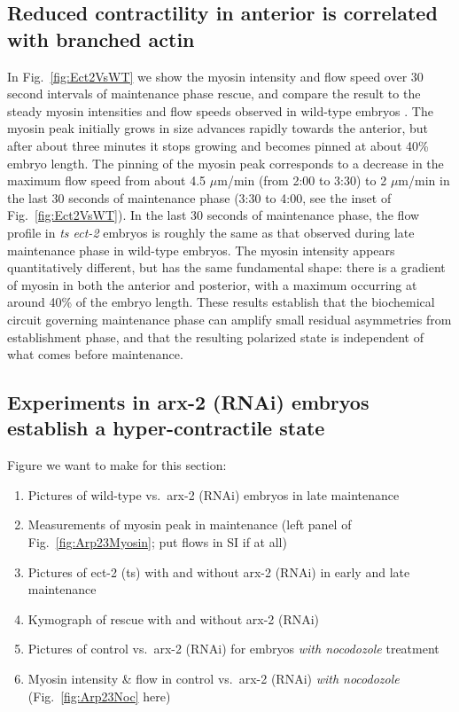 \documentclass[11pt]{article}
\newcommand{\red}[1]{\color{red}#1\normalcolor}
\newcommand{\6}[1]{#1_{\text{6}}}
\newcommand{\3}[1]{#1_{\text{3}}}
\begin{document}
\subsection{Reduced contractility in anterior is correlated with branched actin}
In Fig.\ \ref{fig:Ect2VsWT} we show the myosin intensity and flow speed over 30 second intervals of maintenance phase rescue, and compare the result to the steady myosin intensities and flow speeds observed in wild-type embryos \citep{sailer2015dynamic}. The myosin peak initially grows in size advances rapidly towards the anterior, but after about three minutes it stops growing and becomes pinned at about 40\% embryo length. The pinning of the myosin peak corresponds to a decrease in the maximum flow speed from about 4.5 $\mu$m/min (from 2:00 to 3:30) to 2 $\mu$m/min in the last 30 seconds of maintenance phase (3:30 to 4:00, see the inset of Fig.\ \ref{fig:Ect2VsWT}). In the last 30 seconds of maintenance phase, the flow profile in \emph{ts ect-2} embryos is roughly the same as that observed during late maintenance phase in wild-type embryos. The myosin intensity appears quantitatively different, but has the same fundamental shape: there is a gradient of myosin in both the anterior and posterior, with a maximum occurring at around 40\% of the embryo length. These results establish that the biochemical circuit governing maintenance phase can amplify small residual asymmetries from establishment phase, and that the resulting polarized state is independent of what comes before maintenance. 

\subsection{Experiments in arx-2 (RNAi) embryos establish a hyper-contractile state}
\red{Figure we want to make for this section:
\begin{enumerate}[label=(\alph*),topsep=0pt,itemsep=-2ex]
\item Pictures of wild-type vs.\ arx-2 (RNAi) embryos in late maintenance
\item Measurements of myosin peak in maintenance (left panel of Fig.\ \ref{fig:Arp23Myosin}; put flows in SI if at all)
\item Pictures of ect-2 (ts) with and without arx-2 (RNAi) in early and late maintenance
\item Kymograph of rescue with and without arx-2 (RNAi) 
\item Pictures of control vs.\ arx-2 (RNAi) for embryos \emph{with nocodozole} treatment 
\item Myosin intensity \& flow in control vs.\ arx-2 (RNAi) \emph{with nocodozole} (Fig.\ \ref{fig:Arp23Noc} here)
\end{enumerate}
}
\end{document}
